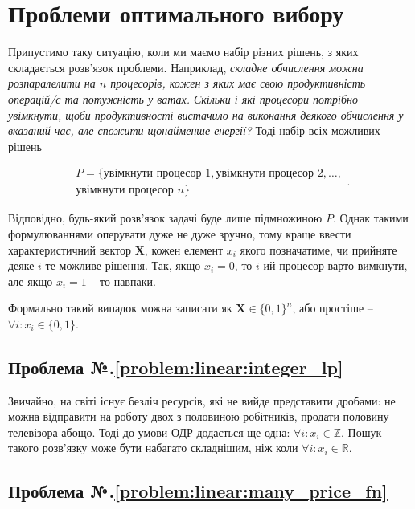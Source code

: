 \documentclass[\main/book.tex]{subfiles}
\begin{document}
\section{Проблеми оптимального вибору}
\label{section:linear:x_in_0-1}

Припустимо таку ситуацію, коли ми маємо набір різних рішень, з яких складається розв'язок проблеми. Наприклад, \textit{складне обчислення можна розпаралелити на $n$ процесорів, кожен з яких має свою продуктивність операцій/с та потужність у ватах. Скільки і які процесори потрібно увімкнути, щоби продуктивності вистачило на виконання деякого обчислення у вказаний час, але спожити щонайменше енергії?} Тоді набір всіх можливих рішень

\[
\begin{split}
P = \{
 \text{увімкнути процесор 1},
 \text{увімкнути процесор 2},
 \ldots, \\
 \text{увімкнути процесор $n$}
\}
\end{split}
.
\]

Відповідно, будь-який розв'язок задачі буде лише підмножиною $P$. Однак такими формулюваннями оперувати дуже не дуже зручно, тому краще ввести характеристичний вектор $\mathbf{X}$, кожен елемент $x_i$ якого позначатиме, чи прийняте деяке $i$-те можливе рішення. Так, якщо $x_i=0$, то $i$-ий процесор варто вимкнути, але якщо $x_i=1$ -- то навпаки.

\begin{note}
 Формально такий випадок можна записати як $\mathbf{X} \in \{0, 1\}^{n}$, або простіше -- $\forall i: x_i \in \{0, 1\}$.
\end{note}

\clearpage
{}

\subsection*{Проблема №.\ref{problem:linear:integer_lp}}

Звичайно, на світі існує безліч ресурсів, які не вийде представити дробами: не можна відправити на роботу двох з половиною робітників, продати половину телевізора абощо. Тоді до умови ОДР додається ще одна: $\forall i: x_i \in \mathbb{Z}$. Пошук такого розв'язку може бути набагато складнішим, ніж коли $\forall i: x_i \in \mathbb{R}$.

\subsection*{Проблема №.\ref{problem:linear:many_price_fn}}
\end{document}
